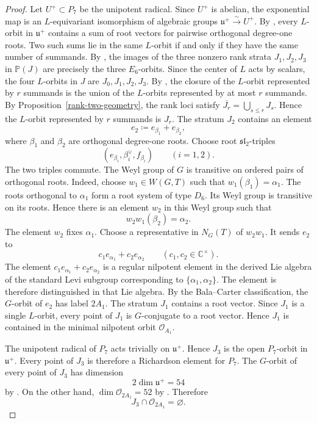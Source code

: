\documentclass[12pt]{article}
\theoremstyle{definition}
\begin{document}
\begin{proof}
Let \(U^+\subset P_7\) be the unipotent radical. Since \(U^+\) is
abelian, the exponential map is an \(L\)-equivariant isomorphism of
algebraic groups \(\mathfrak u^+\xrightarrow{\sim}U^+\). By
\cite[Propositions~2.8 and~2.13]{RRS}, every \(L\)-orbit in
\(\mathfrak u^+\) contains a sum of root vectors for pairwise
orthogonal degree-one roots. Two such sums lie in the same \(L\)-orbit
if and only if they have the same number of summands. By
\cite[Proposition~4.1]{LM}, the images of the three nonzero rank strata
\(J_1,J_2,J_3\) in \(\mathbb P(J)\) are precisely the three \(E_6\)-orbits.
Since the
center of \(L\) acts by scalars, the four
\(L\)-orbits in \(J\) are \(J_0,J_1,J_2,J_3\).
By \cite[Proposition~2.15(a)]{RRS}, the closure
of the \(L\)-orbit represented by \(r\) summands is the union of the
\(L\)-orbits represented by at most \(r\) summands. By
Proposition~\ref{rank-two-geometry}, the rank loci satisfy
\(\overline{J_r}=\bigcup_{s\leq r}J_s\). Hence the \(L\)-orbit represented
by \(r\) summands is \(J_r\).
The stratum \(J_2\) contains an element
\[
    e_2\coloneqq e_{\beta_1}+e_{\beta_2},
\]
where \(\beta_1\) and \(\beta_2\) are orthogonal degree-one roots.
Choose root \(\mathfrak{sl}_2\)-triples
\[
    (e_{\beta_i},\beta_i^\vee,f_{\beta_i})
    \qquad(i=1,2).
\]
The two triples commute. The Weyl group of \(G\) is transitive on ordered
pairs of orthogonal roots. Indeed, choose \(w_1\in W(G,T)\) such that
\(w_1(\beta_1)=\alpha_1\). The roots orthogonal to \(\alpha_1\) form a
root system of type \(D_6\). Its Weyl group is transitive on its roots.
Hence there is an element \(w_2\) in this Weyl group such that
\[
    w_2w_1(\beta_2)=\alpha_2.
\]
The element \(w_2\) fixes \(\alpha_1\). Choose a representative in
\(N_G(T)\) of \(w_2w_1\). It sends \(e_2\) to
\[
    c_1e_{\alpha_1}+c_2e_{\alpha_2}
    \qquad(c_1,c_2\in\mathbb C^\times).
\]
The element \(c_1e_{\alpha_1}+c_2e_{\alpha_2}\) is a regular nilpotent
element in the derived Lie algebra of the standard Levi subgroup corresponding to
\(\{\alpha_1,\alpha_2\}\). The element is therefore distinguished in that
Lie algebra. By the Bala--Carter classification, the \(G\)-orbit of \(e_2\)
has label \(2A_1\). The stratum \(J_1\) contains a root vector.
Since \(J_1\) is a single \(L\)-orbit, every point of \(J_1\) is
\(G\)-conjugate to a root vector. Hence \(J_1\) is contained in the
minimal nilpotent orbit \(\mathcal O_{A_1}\).

The unipotent radical of \(P_7\) acts trivially on \(\mathfrak u^+\).
Hence \(J_3\) is the open \(P_7\)-orbit in \(\mathfrak u^+\). Every point
of \(J_3\) is therefore a Richardson element for \(P_7\). The \(G\)-orbit
of every point of \(J_3\) has dimension
\[
    2\dim\mathfrak u^+=54
\]
by \cite[Theorem~7.1.1]{CM}. On the other hand,
\(\dim\mathcal O_{2A_1}=52\) by \cite[Section~8.4]{CM}. Therefore
\[
    J_3\cap\mathcal O_{2A_1}=\varnothing.
\]


\end{proof}
\end{document}
